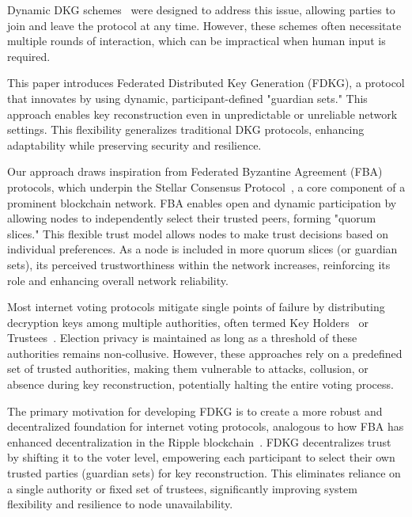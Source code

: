 \documentclass[lettersize,journal]{IEEEtran}
\theoremstyle{definition}
\begin{document}
Dynamic DKG schemes~\cite{delerableeDynamicThresholdPublickey2008} were designed to address this issue, allowing parties to join and leave the protocol at any time. However, these schemes often necessitate multiple rounds of interaction, which can be impractical when human input is required.

This paper introduces Federated Distributed Key Generation (FDKG), a protocol that innovates by using dynamic, participant-defined "guardian sets." This approach enables key reconstruction even in unpredictable or unreliable network settings.  This flexibility generalizes traditional DKG protocols, enhancing adaptability while preserving security and resilience.

Our approach draws inspiration from Federated Byzantine Agreement (FBA) protocols, which underpin the Stellar Consensus Protocol~\cite{mazieresStellarConsensusProtocol2015}, a core component of a prominent blockchain network. FBA enables open and dynamic participation by allowing nodes to independently select their trusted peers, forming "quorum slices." This flexible trust model allows nodes to make trust decisions based on individual preferences.  As a node is included in more quorum slices (or guardian sets), its perceived trustworthiness within the network increases, reinforcing its role and enhancing overall network reliability.

Most internet voting protocols mitigate single points of failure by distributing decryption keys among multiple authorities, often termed Key Holders~\cite{barandiaranDecidimTechnopoliticalNetwork2024,adidaHeliosWebbasedOpenAudit2008,haenniCHVoteProtocolSpecification2017,larraiaSVoteControlComponents2022} or Trustees~\cite{cortierBeleniosSimplePrivate2019,mattbeckerProofVoteEndtoend2018}.  Election privacy is maintained as long as a threshold of these authorities remains non-collusive. However, these approaches rely on a predefined set of trusted authorities, making them vulnerable to attacks, collusion, or absence during key reconstruction, potentially halting the entire voting process.

The primary motivation for developing FDKG is to create a more robust and decentralized foundation for internet voting protocols, analogous to how FBA has enhanced decentralization in the Ripple blockchain~\cite{mazieresStellarConsensusProtocol2015}. FDKG decentralizes trust by shifting it to the voter level, empowering each participant to select their own trusted parties (guardian sets) for key reconstruction. This eliminates reliance on a single authority or fixed set of trustees, significantly improving system flexibility and resilience to node unavailability.
\end{document}
